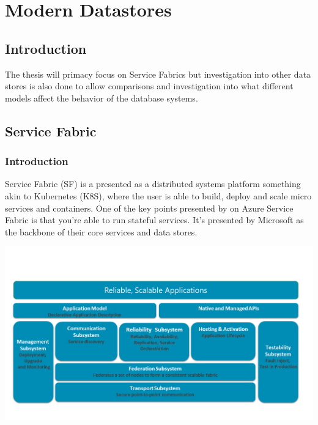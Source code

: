 \documentclass[a4paper,10pt,titlepage]{report}
\begin{document}






    \newpage


    \chapter{Modern Datastores}


    \section{Introduction}

    The thesis will primacy focus on Service Fabrics but investigation into other data stores is also done to allow comparisons and investigation into what different models affect the behavior of the database systems.


    \section{Service Fabric}

%

    \subsection{Introduction}

    Service Fabric (SF) is a presented as a distributed systems platform something akin to Kubernetes (K8S), where the user is able to build, deploy and scale micro services and containers. One of the key points presented by on Azure Service Fabric is that you're able to run stateful services. It's presented by Microsoft as the backbone of their core services and data stores.\\
    \vspace{5mm}

    \includegraphics[scale=0.5]{images/service-fabric-architecture.png}
\end{document}
